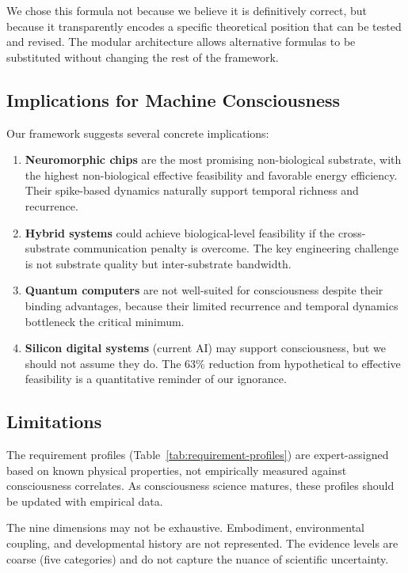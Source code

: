 \documentclass[12pt,a4paper]{article}
\begin{document}
We chose this formula not because we believe it is definitively correct, but because it transparently encodes a specific theoretical position that can be tested and revised. The modular architecture allows alternative formulas to be substituted without changing the rest of the framework.

\subsection{Implications for Machine Consciousness}

Our framework suggests several concrete implications:

\begin{enumerate}
    \item \textbf{Neuromorphic chips} are the most promising non-biological substrate, with the highest non-biological effective feasibility and favorable energy efficiency. Their spike-based dynamics naturally support temporal richness and recurrence.
    \item \textbf{Hybrid systems} could achieve biological-level feasibility if the cross-substrate communication penalty is overcome. The key engineering challenge is not substrate quality but inter-substrate bandwidth.
    \item \textbf{Quantum computers} are not well-suited for consciousness despite their binding advantages, because their limited recurrence and temporal dynamics bottleneck the critical minimum.
    \item \textbf{Silicon digital systems} (current AI) may support consciousness, but we should not assume they do. The 63\% reduction from hypothetical to effective feasibility is a quantitative reminder of our ignorance.
\end{enumerate}

\subsection{Limitations}

The requirement profiles (Table~\ref{tab:requirement-profiles}) are expert-assigned based on known physical properties, not empirically measured against consciousness correlates. As consciousness science matures, these profiles should be updated with empirical data.

The nine dimensions may not be exhaustive. Embodiment, environmental coupling, and developmental history are not represented. The evidence levels are coarse (five categories) and do not capture the nuance of scientific uncertainty.
\end{document}
